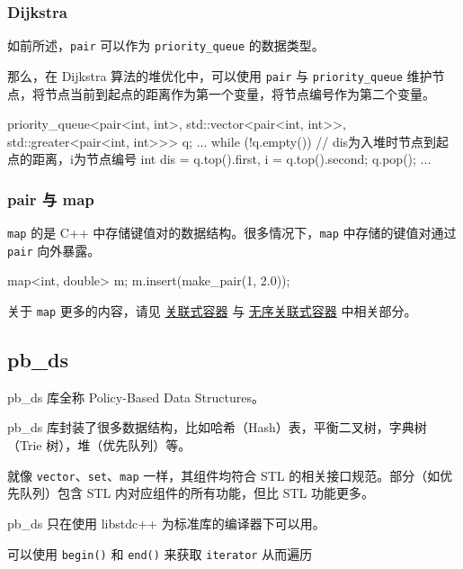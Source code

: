 \subsubsection{Dijkstra}\label{dijkstra}

如前所述，\texttt{pair} 可以作为 \texttt{priority\_queue} 的数据类型。

那么，在 Dijkstra 算法的堆优化中，可以使用 \texttt{pair} 与 \texttt{priority\_queue} 维护节点，将节点当前到起点的距离作为第一个变量，将节点编号作为第二个变量。


\begin{codeline}
priority_queue<pair<int, int>, std::vector<pair<int, int>>,
               std::greater<pair<int, int>>>
    q;
... while (!q.empty()) {
  // dis为入堆时节点到起点的距离，i为节点编号
  int dis = q.top().first, i = q.top().second;
  q.pop();
  ...
}
\end{codeline}


\subsubsection{pair 与 map}\label{pair-ux4e0e-map}

\texttt{map} 的是 C++ 中存储键值对的数据结构。很多情况下，\texttt{map} 中存储的键值对通过 \texttt{pair} 向外暴露。


\begin{codeline}
map<int, double> m;
m.insert(make_pair(1, 2.0));
\end{codeline}


关于 \texttt{map} 更多的内容，请见 \href{./associative-container.md}{关联式容器} 与 \href{./unordered-container.md}{无序关联式容器} 中相关部分。

\subsection{pb\_ds}\label{pb_ds}

pb\_ds 库全称 Policy-Based Data Structures。

pb\_ds 库封装了很多数据结构，比如哈希（Hash）表，平衡二叉树，字典树（Trie 树），堆（优先队列）等。

就像 \texttt{vector}、\texttt{set}、\texttt{map} 一样，其组件均符合 STL 的相关接口规范。部分（如优先队列）包含 STL 内对应组件的所有功能，但比 STL 功能更多。

pb\_ds 只在使用 libstdc++ 为标准库的编译器下可以用。

可以使用 \texttt{begin()} 和 \texttt{end()} 来获取 \texttt{iterator} 从而遍历

